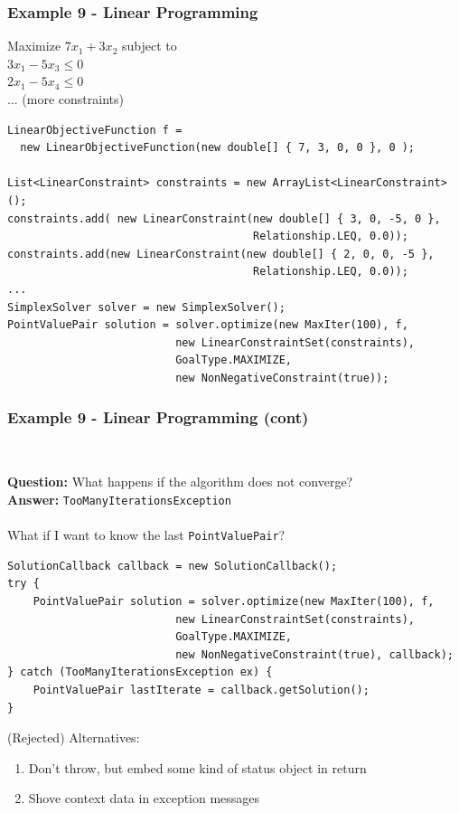\documentclass[14pt,mathserif]{beamer}
\begin{document}
\begin{frame}[fragile]
  \frametitle{Example 9 - Linear Programming} 

\begin{small}
Maximize \(7x_1 + 3x_2\) subject to \\
\(3x_1 - 5x_3 \leq 0\) \\
\(2x_1 -5x_4 \leq 0\) \\
... (more constraints)

\begin{verbatim}
LinearObjectiveFunction f = 
  new LinearObjectiveFunction(new double[] { 7, 3, 0, 0 }, 0 );

List<LinearConstraint> constraints = new ArrayList<LinearConstraint>();
constraints.add( new LinearConstraint(new double[] { 3, 0, -5, 0 },
                                      Relationship.LEQ, 0.0));  
constraints.add(new LinearConstraint(new double[] { 2, 0, 0, -5 },
                                      Relationship.LEQ, 0.0));
...
SimplexSolver solver = new SimplexSolver();
PointValuePair solution = solver.optimize(new MaxIter(100), f,
                          new LinearConstraintSet(constraints),
                          GoalType.MAXIMIZE,
                          new NonNegativeConstraint(true));
\end{verbatim}
\end{small}
\end{frame}

\begin{frame}[fragile]
  \frametitle{Example 9 - Linear Programming (cont)} 
\\ 
\begin{small}
\textbf{Question:} What happens if the algorithm does not converge? \\
\textbf{Answer:} \texttt{TooManyIterationsException} \\~\\
What if I want to know the last \texttt{PointValuePair}?

\begin{verbatim}
SolutionCallback callback = new SolutionCallback();
try {
    PointValuePair solution = solver.optimize(new MaxIter(100), f,
                          new LinearConstraintSet(constraints),
                          GoalType.MAXIMIZE,
                          new NonNegativeConstraint(true), callback);
} catch (TooManyIterationsException ex) {
	PointValuePair lastIterate = callback.getSolution();
}
\end{verbatim}

(Rejected) Alternatives:
\begin{enumerate}
\item Don't throw, but embed some kind of status object in return
\item Shove context data in exception messages
\end{enumerate}
\end{small}
\end{frame}
\end{document}
